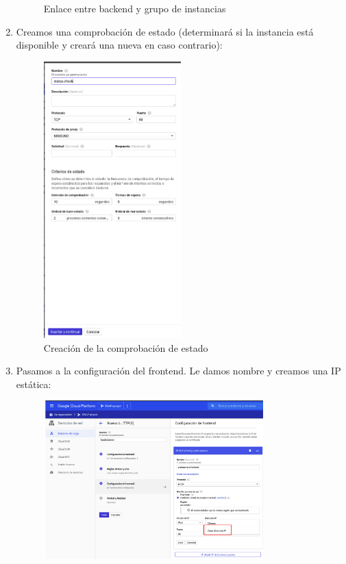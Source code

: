 \documentclass[12pt,spanish]{article}
\begin{document}
\begin{enumerate}
\begin{figure}[H]
		\caption{Enlace entre backend y grupo de instancias}
	\end{figure}
	\newpage
	\item Creamos una comprobación de estado (determinará si la instancia está disponible y creará una nueva en caso contrario):
	\begin{figure}[H]
		\centering
		\includegraphics[width=0.5\textwidth]{project/status_check.png}
		\caption{Creación de la comprobación de estado}
	\end{figure}
	\newpage
	\item Pasamos a la configuración del frontend. Le damos nombre y creamos una IP estática:
	\begin{figure}[H]
		\centering
		\includegraphics[width=0.8\textwidth]{project/frontend.png}

\end{figure}
\end{enumerate}
\end{document}
